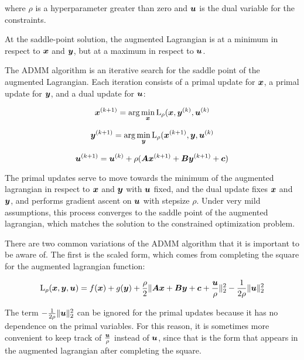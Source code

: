 where $\rho$ is a hyperparameter greater than zero and $\bm{u}$ is the dual variable for the constraints.

At the saddle-point solution, the augmented Lagrangian is at a minimum in respect to $\bm{x}$ and $\bm{y}$, but at a maximum in respect to $\bm{u}$.

The ADMM algorithm is an iterative search for the saddle point of the augmented Lagrangian. Each iteration consists of a primal update for $\bm{x}$, a primal update for $\bm{y}$, and a dual update for $\bm{u}$:

\begin{equation}
\bm{x}^{(k + 1)} = \arg\min_{\bm{x}} \operatorname{L}_{\rho}(\bm{x},\bm{y}^{(k)},\bm{u}^{(k)}
\end{equation}

\begin{equation}
\bm{y}^{(k + 1)} = \arg\min_{\bm{y}} \operatorname{L}_{\rho}(\bm{x}^{(k + 1)},\bm{y},\bm{u}^{(k)}
\end{equation}

\begin{equation}
\bm{u}^{(k + 1)} = \bm{u}^{(k)} + \rho(\bm{A}\bm{x}^{(k + 1)} + \bm{B}\bm{y}^{(k + 1)} + \bm{c})
\end{equation}

The primal updates serve to move towards the minimum of the augmented lagrangian in respect to $\bm{x}$ and $\bm{y}$ with $\bm{u}$ fixed, and the dual update fixes $\bm{x}$ and $\bm{y}$, and performs gradient ascent on $\bm{u}$ with stepsize $\rho$. Under very mild assumptions, this process converges to the saddle point of the augmented lagrangian, which matches the solution to the constrained optimization problem.

There are two common variations of the ADMM algorithm that it is important to be aware of.  The first is the scaled form, which comes from completing the square for the augmented lagrangian function:

\begin{equation}
\operatorname{L}_{\rho}(\bm{x},\bm{y},\bm{u}) = f(\bm{x}) + g(\bm{y}) + \frac{\rho}{2}\|\bm{A}\bm{x} + \bm{B}\bm{y} + \bm{c} + \frac{\bm{u}}{\rho}\|_2^2 - \frac{1}{2\rho}\|\bm{u}\|_2^2
\end{equation}

The term $-\frac{1}{2\rho}\|\bm{u}\|_2^2$ can be ignored for the primal updates because it has no dependence on the primal variables. For this reason, it is sometimes more convenient to keep track of $\frac{\bm{u}}{\rho}$ instead of $\bm{u}$, since that is the form that appears in the augmented lagrangian after completing the square.

